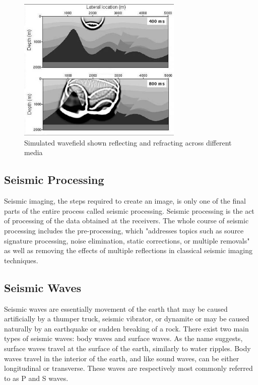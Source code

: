 \begin{figure}[ht]
	\centering
	\includegraphics[width=0.7\textwidth]{Images/reflectionrefraction.jpg}
	\caption{Simulated wavefield shown reflecting and refracting across different media}
	\label{fig:Wavefield-Reflection-And-Refraction}
\end{figure}

\subsection{Seismic Processing}

Seismic imaging, the steps required to create an image, is only one of the final parts of the entire process called seismic processing. Seismic processing is the act of processing of the data obtained at the receivers. The whole course of seismic processing includes the pre-processing, which "addresses topics such as source signature processing, noise elimination, static corrections, or multiple removals" \cite{EAGE} as well as removing the effects of multiple reflections in classical seismic imaging techniques.

\subsection{Seismic Waves}

Seismic waves are essentially movement of the earth that may be caused artificially by a thumper truck, seismic vibrator, or dynamite or may be caused naturally by an earthquake or sudden breaking of a rock. There exist two main types of seismic waves: body waves and surface waves. As the name suggests, surface waves travel at the surface of the earth, similarly to water ripples. Body waves travel in the interior of the earth, and like sound waves, can be either longitudinal or transverse. These waves are respectively most commonly referred to as P and S waves.

